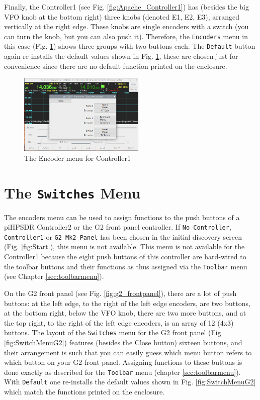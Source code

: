 \documentclass[12pt]{book}
\def\rett#1{\texttt{\color{red}#1}}
\def\bltt#1{\texttt{\color{blue}#1}}
\def\pH{pi\-HPSDR\xspace}
\begin{document}
Finally, the Controller1 (see Fig. \ref{fig:Apache_Controller1})
has (besides the big VFO knob at the bottom right)
three knobs (denoted E1, E2, E3), arranged vertically at the right edge. These knobs
are single encoders with a switch (you can turn the knob, but you can also push it). Therefore,
the \bltt{Encoders} menu in this case (Fig. \ref{fig:EncoderMenuV1}) shows three groups with
two buttons each. The \rett{Default} button again re-installs the default values shown in
Fig. \ref{fig:EncoderMenuV1}, these are chosen just for convenience since there are no default
function printed on the enclosure.

\begin{figure}[ht!]
\center
\includegraphics[width=6cm]{EncoderMenuV1.png}
\caption{The Encoder menu for Controller1}
\label{fig:EncoderMenuV1}
\end{figure}

\clearpage
\section{The \texttt{Switches} Menu}

The encoders menu can be used to assign functions to the push buttons of a
\pH  Controller2 or the G2 front panel controller.
If \texttt{No Controller}, \texttt{Controller1} or \texttt{G2 Mk2 Panel}
has been chosen in the initial discovery screen
(Fig. \ref{fig:Start}), this menu is not available. This menu is not available
for the Controller1 because the eight push buttons of this controller are hard-wired to
the toolbar buttons and their functions as thus assigned via the \bltt{Toolbar} menu
(see Chapter \ref{sec:toolbarmenu}).

On the G2 front panel (see Fig. \ref{fig:g2_frontpanel}),
 there are a lot of push buttons: at the left edge, to the right
of the left edge encoders, are two buttons, at the bottom right, below the VFO knob,
there are two more buttons, and at the top right, to the right of the left edge
encoders, is an array of 12 (4x3) buttons. The layout of the \bltt{Switches} menu
for the G2 front panel (Fig. \ref{fig:SwitchMenuG2}) features (besides the Close
button) sixteen buttons, and their arrangement is such that you can easily guess
which menu button refers to which button on your G2 front panel. Assigning functions
to these buttons is done exactly as described for the \bltt{Toolbar} menu
(chapter \ref{sec:toolbarmenu}). With \rett{Default} one re-installs the default values
shown in Fig. \ref{fig:SwitchMenuG2} which match the functions printed on the enclosure.
\end{document}
